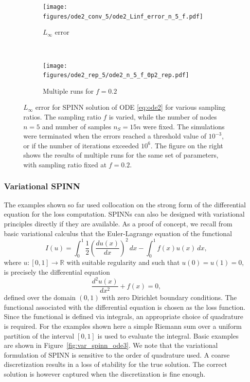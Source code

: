 \documentclass[12pt]{article}
\newcommand{\new}[1]{#1}
\begin{document}
\begin{figure}
\begin{subfigure}{0.5\textwidth}
\centering
\texttt{[image: figures/ode2\_conv\_5/ode2\_Linf\_error\_n\_5\_f.pdf]}
\caption{$L_{\infty}$ error}
\label{fig:ode2_n_5_Linf}
\end{subfigure}
~
\begin{subfigure}{0.5\textwidth}
\centering
\texttt{[image: figures/ode2\_rep\_5/ode2\_n\_5\_f\_0p2\_rep.pdf]}
\caption{Multiple runs for $f=0.2$}
\label{fig:ode2_n_5_rep}
\end{subfigure}
\caption{$L_\infty$ error for SPINN solution of ODE \eqref{eq:ode2} for various sampling ratios. The sampling ratio $f$ is varied, while the number of nodes $n=5$ and number of samples $n_S = 15n$ were fixed. The simulations were terminated when the errors reached a threshold value of $10^{-3}$, or if the number of iterations exceeded $10^6$. The figure on the right shows the results of multiple runs for the same set of parameters, with sampling ratio fixed at $f=0.2$.}
\label{fig:spinn_ode2_errors}
\end{figure}

\subsubsection{Variational SPINN}
\new{The examples shown so far used collocation on the strong form of the differential equation for the loss computation. SPINNs can also be designed with variational principles directly if they are available. As a proof of concept, we recall from basic variational calculus that the Euler-Lagrange equation of the functional
\begin{displaymath}
I(u) = \int_0^1 \frac{1}{2} \left(\frac{du(x)}{dx}\right)^2 \, dx - \int_0^1 f(x) u(x) \, dx,
\end{displaymath}
where $u:[0,1]\to\mathbb{R}$ with suitable regularity and such that $u(0) = u(1) = 0$, is precisely the differential equation
\begin{displaymath}
\frac{d^2u (x)}{dx^2} + f(x) = 0,
\end{displaymath}
defined over the domain $(0,1)$ with zero Dirichlet boundary conditions. The functional associated with the differential equation is chosen as the loss function. Since the functional is defined via integrals, an appropriate choice of quadrature is required. For the examples shown here a simple Riemann sum over a uniform partition of the interval $[0,1]$ is used to evaluate the integral. Basic examples are shown in Figure~\ref{fig:var_spinn_ode3}. We note that the variational formulation of SPINN is sensitive to the order of quadrature used.  A coarse discretization results in a loss of stability for the true solution.  The correct solution is however captured when the discretization is fine enough.}
\end{document}
